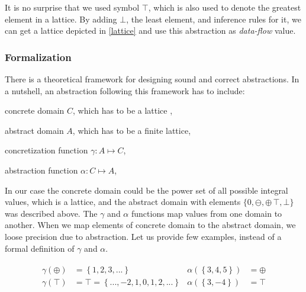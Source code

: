         It is no surprise that we used symbol $\top$, which is also used to denote the 
        greatest element in a lattice. By adding $\bot$, the least element, and inference 
        rules for it, we can get a lattice depicted in \ref{lattice} and use 
        this abstraction as \emph{data-flow} value.
        
        \subsubsection*{Formalization}

        There is a theoretical framework for designing sound and correct 
        abstractions. In a nutshell, an abstraction following this framework 
        has to include: 
        
        \begin{itemize*}
            \item concrete domain $C$, which has to be a lattice ,
            \item abstract domain $A$, which has to be a finite lattice,
            \item concretization function $\gamma{}:A\mapsto{}C$,
            \item abstraction function $\alpha{}:C\mapsto{}A$,
        \end{itemize*}
        
        In our case the concrete domain could be the power set of all 
        possible integral values, which is a lattice, and the abstract 
        domain with elements $\{0, \ominus, \oplus\, \top, \bot\}$ was 
        described above. The $\gamma$ and $\alpha$ functions map values 
        from one domain to another. When we map elements of concrete domain 
        to the abstract domain, we loose precision due to abstraction. 
        Let us provide few examples, instead of a formal definition 
        of $\gamma$ and $\alpha$.
        
        \begin{align*}
            \begin{split}
                \gamma{}(\oplus) &= \left\{1, 2, 3, ...\right\} \\
                \gamma{}(\top) &= \top = \left\{..., -2, 1, 0, 1, 2, ...\right\} \\
            \end{split}
            \begin{split}
                \alpha{}(\left\{3, 4, 5\right\}) &= \oplus \\ 
                \alpha{}(\left\{3, -4\right\}) &= \top \\
            \end{split}
        \end{align*}
        
